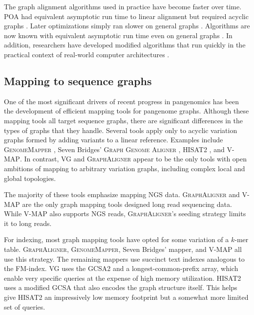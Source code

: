 \documentclass[11pt]{ucthesis}
\begin{document}
The graph alignment algorithms used in practice have become faster over time.
POA had equivalent asymptotic run time to linear alignment but required acyclic graphs \cite{lee2002multiple}. 
Later optimizations simply ran slower on general graphs \cite{kavya2019sequence}.
Algorithms are now known with equivalent asymptotic run time even on general graphs \cite{jain2020complexity}.
In addition, researchers have developed modified algorithms that run quickly in the practical context of real-world computer architectures \cite{rautiainen2019bit,jain2019accelerating,ivanov2020astarix}.

\subsection{Mapping to sequence graphs}

One of the most significant drivers of recent progress in pangenomics has been the development of efficient mapping tools for pangenome graphs.
Although these mapping tools all target sequence graphs, there are significant differences in the types of graphs that they handle.
Several tools apply only to acyclic variation graphs formed by adding variants to a linear reference.
Examples include \textsc{GenomeMapper} \cite{schneeberger2009simultaneous}, Seven Bridges' \textsc{Graph Genome Aligner} \cite{rakocevic2019fast}, \textsc{HISAT2} \cite{kim2019graph}, and \textsc{V-MAP}\cite{vaddadi2019read}.
In contrast, \textsc{VG} \cite{garrison2018variation} and \textsc{GraphAligner} \cite{rautiainen2020graphaligner} appear to be the only tools with open ambitions of mapping to arbitrary variation graphs, including complex local and global topologies.

The majority of these tools emphasize mapping NGS data. 
\textsc{GraphAligner} and \textsc{V-MAP} are the only graph mapping tools designed long read sequencing data.
While \textsc{V-MAP} also supports NGS reads, \textsc{GraphAligner}'s seeding strategy limits it to long reads.

For indexing, most graph mapping tools have opted for some variation of a $k$-mer table. 
\textsc{GraphAligner}, \textsc{GenomeMapper}, Seven Bridges' mapper, and \textsc{V-MAP} all use this strategy. 
The remaining mappers use succinct text indexes analogous to the FM-index.
\textsc{VG} uses the GCSA2 \cite{siren2017indexing} and a longest-common-prefix array, which enable very specific queries at the expense of high memory utilization.
\textsc{HISAT2} uses a modified GCSA \cite{siren2014indexing} that also encodes the graph structure itself.
This helps give \textsc{HISAT2} an impressively low memory footprint but a somewhat more limited set of queries.
\end{document}
